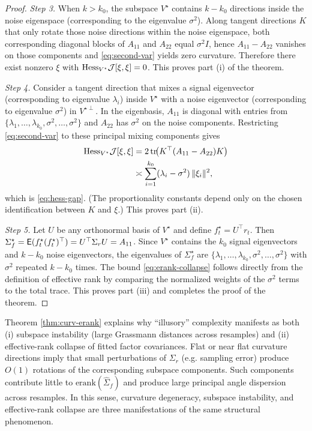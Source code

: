 \documentclass[twoside,11pt,letter]{article}
\begin{document}
\begin{proof}
\smallskip\noindent
\textit{Step 3.} When $k>k_0$, the subspace $V^\star$ contains $k-k_0$ directions inside the noise eigenspace (corresponding to the eigenvalue $\sigma^2$). Along tangent directions $K$ that only rotate those noise directions within the noise eigenspace, both corresponding diagonal blocks of $A_{11}$ and $A_{22}$ equal $\sigma^2 I$, hence $A_{11}-A_{22}$ vanishes on those components and \eqref{eq:second-var} yields zero curvature. Therefore there exist nonzero $\xi$ with $\mathrm{Hess}_{V^\star}{\mathcal{J}}[\xi,\xi]=0$. This proves part (i) of the theorem.

\smallskip\noindent
\textit{Step 4.} Consider a tangent direction that mixes a signal eigenvector (corresponding to eigenvalue $\lambda_i$) inside $V^\star$ with a noise eigenvector (corresponding to eigenvalue $\sigma^2$) in $V^{\star\perp}$. In the eigenbasis, $A_{11}$ is diagonal with entries from $\{\lambda_1,\ldots,\lambda_{k_0},\sigma^2,\ldots,\sigma^2\}$ and $A_{22}$ has $\sigma^2$ on the noise components. Restricting \eqref{eq:second-var} to these principal mixing components gives
\begin{equation*}
\begin{split}
\mathrm{Hess}_{V^\star}{\mathcal{J}}[\xi,\xi]&=2\,\mathrm{tr}\!\bigl(K^\top(A_{11}-A_{22})K\bigr)\\
&\asymp\sum_{i=1}^{k_0}(\lambda_i-\sigma^2)\,\|\xi_i\|^2,
\end{split}
\end{equation*}
which is \eqref{eq:hess-gap}. (The proportionality constants depend only on the chosen identification between $K$ and $\xi$.) This proves part (ii).

\smallskip\noindent
\textit{Step 5.}
Let $U$ be any orthonormal basis of $V^\star$ and define $f_t^\star=U^\top r_t$. Then $\Sigma_f^\star=\mathsf{E}(f_t^\star (f_t^\star)^\top)=U^\top\Sigma_r U=A_{11}$.
Since $V^\star$ contains the $k_0$ signal eigenvectors and $k-k_0$ noise eigenvectors, the eigenvalues of $\Sigma_f^\star$ are $\{\lambda_1,\ldots,\lambda_{k_0},\sigma^2,\ldots,\sigma^2\}$ with $\sigma^2$ repeated $k-k_0$ times. The bound \eqref{eq:erank-collapse} follows directly from the definition of effective rank by comparing the normalized weights of the $\sigma^2$ terms to the total trace. This proves part (iii) and completes the proof of the theorem.
\end{proof}

Theorem \ref{thm:curv-erank} explains why ``illusory'' complexity manifests as both (i) subspace instability (large Grassmann distances across resamples) and
(ii) effective-rank collapse of fitted factor covariances. Flat or near flat curvature directions imply that small perturbations of $\Sigma_r$ (e.g. sampling error) produce $O(1)$ rotations of the corresponding subspace components. Such components contribute little to $\mathrm{erank}(\hat\Sigma_f)$ and produce large principal angle dispersion across resamples. In this sense, curvature degeneracy, subspace instability, and effective-rank collapse are three manifestations of the same structural phenomenon.
\end{document}
